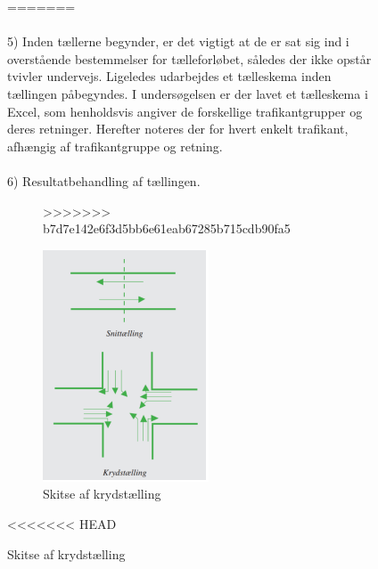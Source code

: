  \begin{figure}[htbp]
   \label{fig:krydstaelling}
=======
~\\\\
5) Inden tællerne begynder, er det vigtigt at de er sat sig ind i overstående bestemmelser for tælleforløbet, således der ikke opstår tvivler undervejs. Ligeledes udarbejdes et tælleskema inden tællingen påbegyndes. I undersøgelsen er der lavet et tælleskema i Excel, som henholdsvis angiver de forskellige trafikantgrupper og deres retninger. Herefter noteres der for hvert enkelt trafikant, afhængig af trafikantgruppe og retning.
~\\\\
6) Resultatbehandling af tællingen.
\begin{figure}[htbp]
>>>>>>> b7d7e142e6f3d5bb6e61eab67285b715cdb90fa5
   \centering
   \begin{adjustbox}{max width=\textwidth}
     \includegraphics[scale=1]{figures/Billederogfigur/krydstaelling.png}
  \end{adjustbox}
   \caption{Skitse af krydstælling}
 \end{figure}
<<<<<<< HEAD



\end{figure}
